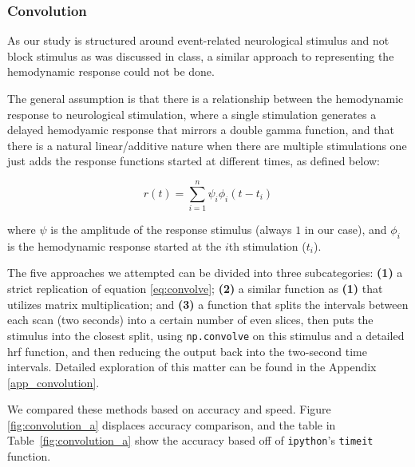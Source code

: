 \subsubsection{Convolution}
\par \indent As our study is structured around event-related neurological 
stimulus and not block stimulus as was discussed in class, a similar 
approach to representing the hemodynamic response could not be done. 

The general assumption is that there is a relationship between the 
hemodynamic response to neurological stimulation, where a single 
stimulation generates a delayed hemodyamic response that mirrors 
a double gamma function, and that there is a natural linear/additive 
nature when there are multiple stimulations one just adds the response 
functions started at different times, as defined below:

\begin{equation} \label{eq:convolve}
r(t)= \sum_{i=1}^n \psi_{i} \phi_{i}(t-t_i)
\end{equation}

\noindent where $\psi$ is the amplitude of the response stimulus (always $1$ 
in our case), and $\phi_{i}$ is the hemodynamic response started at the $i$th 
stimulation ($t_i$).

The five approaches we attempted can be divided into three subcategories: 
\textbf{(1)} a strict replication of equation \ref{eq:convolve}; \textbf{(2)} 
a similar function as \textbf{(1)} that utilizes matrix multiplication; and 
\textbf{(3)} a function that splits the intervals between each scan (two 
seconds) into a certain number of even slices, then puts the stimulus into the 
closest split, using \texttt{np.convolve} on this stimulus and a detailed hrf 
function, and then reducing the output back into the two-second time intervals. 
Detailed exploration of this matter can be found in the Appendix \ref{app_convolution}.

We compared these methods based on accuracy and speed. Figure 
\ref{fig:convolution_a} displaces accuracy comparison, and the table in 
Table~\ref{fig:convolution_a} show the accuracy based off of 
\texttt{ipython}'s \texttt{timeit} function.




